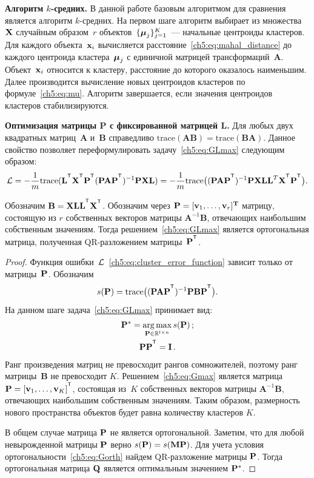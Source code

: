 \textbf{Алгоритм $k$-средних.}
В данной работе базовым алгоритмом для сравнения является алгоритм $k$-средних.
На первом шаге алгоритм выбирает из множества~$\mathbf{X}$ случайным образом~$r$ объектов~$\{\boldsymbol{\mu}_j\}_{j=1}^K$~--- начальные центроиды кластеров.
Для каждого объекта~$\mathbf{x}_i$ вычисляется расстояние~\eqref{ch5:eq:mahal_distance} до каждого центроида кластера~$\boldsymbol{\mu}_j$ с единичной матрицей трансформаций~$\mathbf{A}$.
Объект~$\mathbf{x}_i$ относится к кластеру, расстояние до которого оказалось наименьшим.
Далее производится вычисление новых центроидов кластеров по формуле~\eqref{ch5:eq:mu}.
Алгоритм завершается, если значения центроидов кластеров стабилизируются.

\textbf{Оптимизация матрицы P с фиксированной матрицей L.}
Для любых двух квадратных матриц~$\mathbf{A}$ и~$\mathbf{B}$ справедливо $\text{trace}(\mathbf{AB}) = \text{trace}(\mathbf{BA})$.
Данное свойство позволяет переформулировать задачу~\eqref{ch5:eq:GLmax} следующим образом:
\[
	\cL = -\frac{1}{m} \text{trace} (\mathbf{L}^{\T} \bX^{\T} \bP^{\T} (\bP \mathbf{A} \bP^{\T})^{-1} \bP \bX \mathbf{L}) = -\frac{1}{m} \text{trace} \bigl((\bP \mathbf{A} \bP^{\T})^{-1} \bP \bX \mathbf{LL}^{T} \bX^{\T} \bP^{\T}\bigr).
\]
\begin{statement}
	Обозначим $\mathbf{B} = \bX \mathbf{LL}^{\T} \bX^{\T}$.
	Обозначим через $\mathbf{P} = [\mathbf{v}_1, \ldots, \mathbf{v}_r]^{\mathbf{T}}$ матрицу, состоящую из $r$ собственных векторов матрицы $\mathbf{A}^{-1}\mathbf{B}$, отвечающих наибольшим собственным значениям.
	Тогда решением~\eqref{ch5:eq:GLmax} является ортогональная матрица, полученная QR-разложением матрицы~$\bP^{\T}$.
\end{statement}
\begin{proof}
Функция ошибки~$\mathcal{L}$~\ref{ch5:eq:cluster_error_function} зависит только от матрицы~$\mathbf{P}$. Обозначим
\[
	s(\bP) = \text{trace} \bigl((\bP \mathbf{A} \bP^{\T})^{-1} \bP \mathbf{B} \bP^{\T}\bigr).
\]
На данном шаге задача~\eqref{ch5:eq:GLmax} принимает вид:
\begin{gather}
	\label{ch5:eq:Gmax}
	\bP^* = \argmax_{\bP \in \bbR^{l \times n}} s(\bP)\,; \\
	\label{ch5:eq:Gorth}
	\bP \bP^{\T} = \mathbf{I}\,.
\end{gather}
Ранг произведения матриц не превосходит рангов сомножителей, поэтому ранг матрицы~$\mathbf{B}$ не превосходит $K$.
Решением~\eqref{ch5:eq:Gmax} является матрица $\bP = [\mathbf{v}_1, \ldots, \mathbf{v}_K]^{\T}$, состоящая
из~$K$ собственных векторов матрицы $\mathbf{A}^{-1}\mathbf{B}$, отвечающих наибольшим собственным значениям.
Таким образом, размерность нового пространства объектов будет равна количеству кластеров $K$.

В общем случае матрица $\mathbf{P}$ не является ортогональной.
Заметим, что для любой невырожденной матрицы $\mathbf{P}$ верно $s(\mathbf{P}) = s(\mathbf{M} \mathbf{P})$.
Для учета условия ортогональности~\eqref{ch5:eq:Gorth} найдем QR-разложение матрицы $\mathbf{P}$.
Тогда ортогональная матрица $\mathbf{Q}$ является оптимальным значением $\mathbf{P}^*$.
\end{proof}

